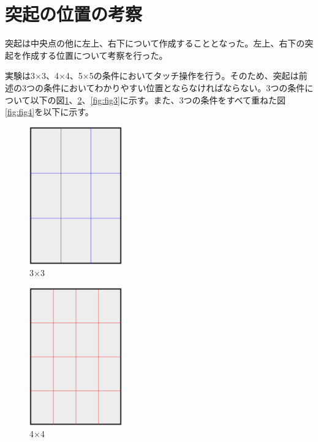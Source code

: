 \documentclass[11pt,a4paper]{jarticle}
\begin{document}
\section{突起の位置の考察}
突起は中央点の他に左上、右下について作成することとなった。左上、右下の突起を作成する位置について考察を行った。


実験は3×3、4×4、5×5の条件においてタッチ操作を行う。そのため、突起は前述の3つの条件においてわかりやすい位置とならなければならない。3つの条件について以下の図\ref{fig:fig1}、\ref{fig:fig2}、\ref{fig:fig3}に示す。また、3つの条件をすべて重ねた図\ref{fig:fig4}を以下に示す。

\begin{figure}[H]
  \begin{center}
  \includegraphics[width=4cm]{fig/photo1.eps}
  \caption{3×3}
  \label{fig:fig1}
  \end{center}
\end{figure}

\begin{figure}[H]
  \begin{center}
  \includegraphics[width=4cm]{fig/photo2.eps}
  \caption{4×4}
  \label{fig:fig2}
  \end{center}
\end{figure}
\end{document}
